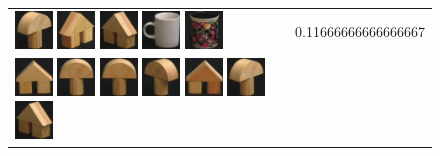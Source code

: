 \begin{figure}[tbp]
\begin{center}
\begin{tabular}{m{11cm} | m{3cm} |}
\includegraphics[width=1cm]{coil/beeld-3.eps}
\includegraphics[width=1cm]{coil/beeld-45.eps}
\includegraphics[width=1cm]{coil/beeld-46.eps}
\includegraphics[width=1cm]{coil/beeld-37.eps}
\includegraphics[width=1cm]{coil/beeld-62.eps}
& {\scriptsize 0.11666666666666667}
\\
\includegraphics[width=1cm]{coil/beeld-42.eps}
\includegraphics[width=1cm]{coil/beeld-0.eps}
\includegraphics[width=1cm]{coil/beeld-1.eps}
\includegraphics[width=1cm]{coil/beeld-4.eps}
\includegraphics[width=1cm]{coil/beeld-43.eps}
\includegraphics[width=1cm]{coil/beeld-3.eps}
\includegraphics[width=1cm]{coil/beeld-46.eps}

\end{tabular}
\end{center}
\end{figure}
